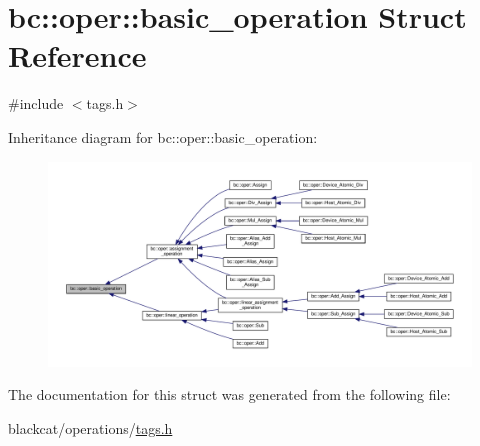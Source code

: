 \hypertarget{structbc_1_1oper_1_1basic__operation}{}\section{bc\+:\+:oper\+:\+:basic\+\_\+operation Struct Reference}
\label{structbc_1_1oper_1_1basic__operation}


{\ttfamily \#include $<$tags.\+h$>$}



Inheritance diagram for bc\+:\+:oper\+:\+:basic\+\_\+operation\+:\nopagebreak
\begin{figure}[H]
\begin{center}
\leavevmode
\includegraphics[width=350pt]{structbc_1_1oper_1_1basic__operation__inherit__graph}
\end{center}
\end{figure}


The documentation for this struct was generated from the following file\+:\begin{DoxyCompactItemize}
\item 
blackcat/operations/\hyperlink{tags_8h}{tags.\+h}\end{DoxyCompactItemize}
